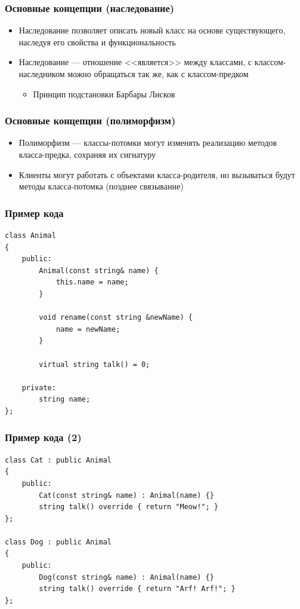 \documentclass[xetex,mathserif,serif]{beamer}
\begin{document}
	\begin{frame}
		\frametitle{Основные концепции (наследование)}
		\begin{itemize}
			\item Наследование позволяет описать новый класс на основе существующего, наследуя его свойства и функциональность
			\item Наследование --- отношение <<является>> между классами, с классом-наследником можно обращаться так же, как с классом-предком
			\begin{itemize}
				\item Принцип подстановки Барбары Лисков
			\end{itemize}
		\end{itemize}
	\end{frame}

	\begin{frame}
		\frametitle{Основные концепции (полиморфизм)}
		\begin{itemize}
			\item Полиморфизм --- классы-потомки могут изменять реализацию методов класса-предка, сохраняя их сигнатуру
			\item Клиенты могут работать с объектами класса-родителя, но вызываться будут методы класса-потомка (позднее связывание)
		\end{itemize}
	\end{frame}

	\begin{frame}[fragile]
		\frametitle{Пример кода}
		\begin{verbatim}
class Animal
{
    public:
        Animal(const string& name) { 
            this.name = name; 
        }

        void rename(const string &newName) { 
            name = newName; 
        }

        virtual string talk() = 0;

    private:
        string name;
};
		\end{verbatim}
	\end{frame}

	\begin{frame}[fragile]
		\frametitle{Пример кода (2)}
		\begin{verbatim}
class Cat : public Animal
{
    public:
        Cat(const string& name) : Animal(name) {}
        string talk() override { return "Meow!"; }
};

class Dog : public Animal
{
    public:
        Dog(const string& name) : Animal(name) {}
        string talk() override { return "Arf! Arf!"; }
};
		\end{verbatim}
	\end{frame}
\end{document}
